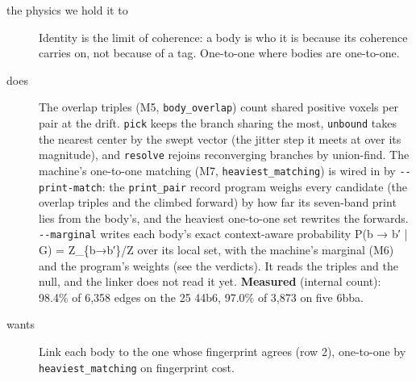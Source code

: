 \begin{description}
\item[{the physics we hold it to}] Identity is the limit of coherence: a body is who it is because its coherence carries on, not because of a tag. One-to-one where bodies are one-to-one.
\item[{does}] The overlap triples (M5, \texttt{body\_\allowbreak{}overlap}) count shared positive voxels per pair at the drift. \texttt{pick} keeps the branch sharing the most, \texttt{unbound} takes the nearest center by the swept vector (the jitter step it meets at over its magnitude), and \texttt{resolve} rejoins reconverging branches by union-find. The machine's one-to-one matching (M7, \texttt{heaviest\_\allowbreak{}matching}) is wired in by \texttt{-\allowbreak{}-\allowbreak{}print-\allowbreak{}match}: the \texttt{print\_\allowbreak{}pair} record program weighs every candidate (the overlap triples and the climbed forward) by how far its seven-band print lies from the body's, and the heaviest one-to-one set rewrites the forwards. \texttt{-\allowbreak{}-\allowbreak{}marginal} writes each body's exact context-aware probability P(b → b′ | G) = Z\_\allowbreak{}\{b→b′\}/Z over its local set, with the machine's marginal (M6) and the program's weights (see the verdicts). It reads the triples and the null, and the linker does not read it yet. \textbf{Measured} (internal count): 98.4\% of 6,358 edges on the 25 44b6, 97.0\% of 3,873 on five 6bba.
\item[{wants}] Link each body to the one whose fingerprint agrees (row 2), one-to-one by \texttt{heaviest\_\allowbreak{}matching} on fingerprint cost.

\end{description}
